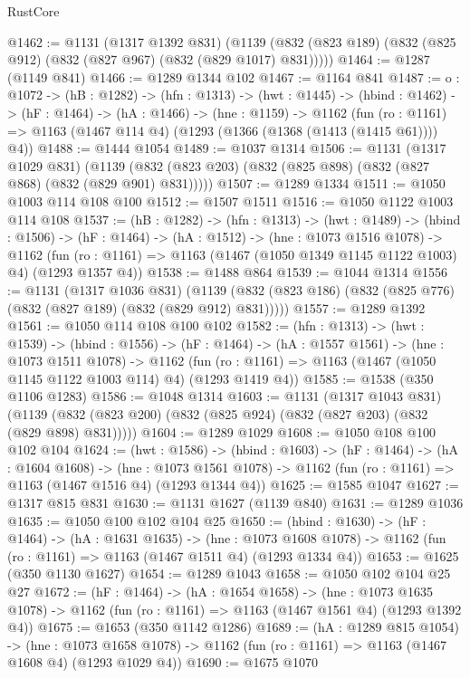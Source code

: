 \begin{lexlean}{RustCore}
\begin{coremodule}
@1462 := @1131
    (@1317 @1392 @831)
    (@1139 (@832 (@823 @189) (@832 (@825 @912) (@832 (@827 @967) (@832 (@829 @1017) @831)))))
@1464 := @1287 (@1149 @841)
@1466 := @1289 @1344 @102
@1467 := @1164 @841
@1487 := {o : @1072} ->
  (hB : @1282) ->
  (hfn : @1313) ->
  (hwt : @1445) ->
  (hbind : @1462) ->
  (hF : @1464) ->
  (hA : @1466) ->
  (hne : @1159) ->
  @1162 (fun (ro : @1161) => @1163 (@1467 @114 @4) (@1293 (@1366 (@1368 (@1413 (@1415 @61)))) @4))
@1488 := @1444 @1054
@1489 := @1037 @1314
@1506 := @1131
    (@1317 @1029 @831)
    (@1139 (@832 (@823 @203) (@832 (@825 @898) (@832 (@827 @868) (@832 (@829 @901) @831)))))
@1507 := @1289 @1334
@1511 := @1050 @1003 @114 @108 @100
@1512 := @1507 @1511
@1516 := @1050 @1122 @1003 @114 @108
@1537 := (hB : @1282) ->
  (hfn : @1313) ->
  (hwt : @1489) ->
  (hbind : @1506) ->
  (hF : @1464) ->
  (hA : @1512) ->
  (hne : @1073 @1516 @1078) ->
  @1162 (fun (ro : @1161) => @1163 (@1467 (@1050 @1349 @1145 @1122 @1003) @4) (@1293 @1357 @4))
@1538 := @1488 @864
@1539 := @1044 @1314
@1556 := @1131
    (@1317 @1036 @831)
    (@1139 (@832 (@823 @186) (@832 (@825 @776) (@832 (@827 @189) (@832 (@829 @912) @831)))))
@1557 := @1289 @1392
@1561 := @1050 @114 @108 @100 @102
@1582 := (hfn : @1313) ->
  (hwt : @1539) ->
  (hbind : @1556) ->
  (hF : @1464) ->
  (hA : @1557 @1561) ->
  (hne : @1073 @1511 @1078) ->
  @1162 (fun (ro : @1161) => @1163 (@1467 (@1050 @1145 @1122 @1003 @114) @4) (@1293 @1419 @4))
@1585 := @1538 (@350 @1106 @1283)
@1586 := @1048 @1314
@1603 := @1131
    (@1317 @1043 @831)
    (@1139 (@832 (@823 @200) (@832 (@825 @924) (@832 (@827 @203) (@832 (@829 @898) @831)))))
@1604 := @1289 @1029
@1608 := @1050 @108 @100 @102 @104
@1624 := (hwt : @1586) ->
  (hbind : @1603) ->
  (hF : @1464) ->
  (hA : @1604 @1608) ->
  (hne : @1073 @1561 @1078) -> @1162 (fun (ro : @1161) => @1163 (@1467 @1516 @4) (@1293 @1344 @4))
@1625 := @1585 @1047
@1627 := @1317 @815 @831
@1630 := @1131 @1627 (@1139 @840)
@1631 := @1289 @1036
@1635 := @1050 @100 @102 @104 @25
@1650 := (hbind : @1630) ->
  (hF : @1464) ->
  (hA : @1631 @1635) ->
  (hne : @1073 @1608 @1078) -> @1162 (fun (ro : @1161) => @1163 (@1467 @1511 @4) (@1293 @1334 @4))
@1653 := @1625 (@350 @1130 @1627)
@1654 := @1289 @1043
@1658 := @1050 @102 @104 @25 @27
@1672 := (hF : @1464) ->
  (hA : @1654 @1658) ->
  (hne : @1073 @1635 @1078) -> @1162 (fun (ro : @1161) => @1163 (@1467 @1561 @4) (@1293 @1392 @4))
@1675 := @1653 (@350 @1142 @1286)
@1689 := (hA : @1289 @815 @1054) ->
  (hne : @1073 @1658 @1078) -> @1162 (fun (ro : @1161) => @1163 (@1467 @1608 @4) (@1293 @1029 @4))
@1690 := @1675 @1070

\end{coremodule}
\end{lexlean}
